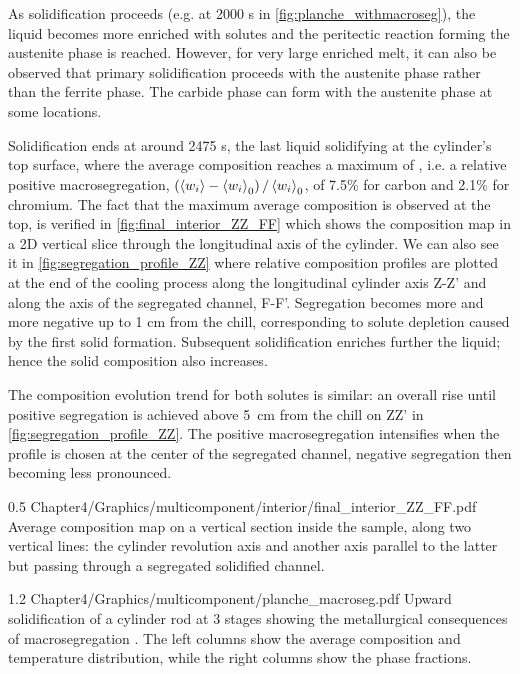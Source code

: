 As solidification proceeds (e.g. at 2000 s in \cref{fig:planche_withmacroseg}), the liquid becomes more enriched with solutes and the peritectic 
reaction forming the austenite phase is reached. However, for very large enriched melt, it can 
also be observed that primary solidification proceeds with the austenite phase rather than the 
ferrite phase. The carbide phase can form with the austenite phase at some locations.

Solidification ends at around \num{2475} s, the last liquid solidifying at the cylinder’s top surface, where the average composition 
reaches a maximum of , i.e. a relative positive macrosegregation, 
$\left( \left \langle w_i \right \rangle-\left \langle w_i \right \rangle_0 \right)/\left \langle w_i \right \rangle_0$, of 7.5\% for carbon and 2.1\% for chromium. The fact that the maximum average 
composition is observed at the top, is verified in \cref{fig:final_interior_ZZ_FF} which shows the composition map in a 2D 
vertical slice through the longitudinal axis of the cylinder. We can also see it in \cref{fig:segregation_profile_ZZ} where 
relative composition profiles are plotted at the end of the cooling process along the longitudinal cylinder 
axis Z-Z’ and along the axis of the segregated channel, F-F’. 
Segregation becomes more and more negative up to 1 cm from the chill, corresponding 
to solute depletion caused by the first solid formation. Subsequent solidification enriches further the 
liquid; hence the solid composition also increases. 

The composition evolution trend for both solutes is similar: 
an overall rise until positive segregation is achieved above \SI{5}{\centi\metre} from the 
chill on ZZ' in \cref{fig:segregation_profile_ZZ}. 
The positive macrosegregation intensifies when the profile is chosen at the center of 
the segregated channel, negative segregation then becoming less pronounced.

\begin{figureth}
{0.5}
{Chapter4/Graphics/multicomponent/interior/final_interior_ZZ_FF.pdf}
{Average composition map on a vertical section inside the sample, along two vertical lines: the cylinder revolution axis
and another axis parallel to the latter but passing through a segregated solidified channel.}
\label{fig:final_interior_ZZ_FF}
\end{figureth}

\begin{landscape}
\begin{figureth}
{1.2}
{Chapter4/Graphics/multicomponent/planche_macroseg.pdf}
{Upward solidification of a cylinder rod  at 3 stages showing the metallurgical consequences 
of macrosegregation . The left columns show the average 
composition and temperature distribution, while the right columns show the phase fractions.}
\label{fig:planche_withmacroseg}
\end{figureth}
\end{landscape}

